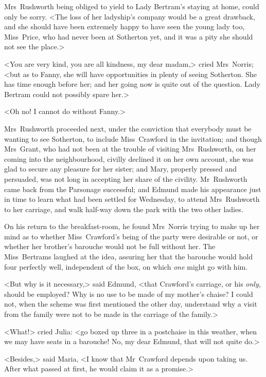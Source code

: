 Mrs~Rushworth being obliged to yield to Lady Bertram's staying at home, could only be sorry. <The loss of her ladyship's company would be a great drawback, and she should have been extremely happy to have seen the young lady too, Miss~Price, who had never been at Sotherton yet, and it was a pity she should not see the place.>

<You are very kind, you are all kindness, my dear madam,> cried Mrs~Norris; <but as to Fanny, she will have opportunities in plenty of seeing Sotherton. She has time enough before her; and her going now is quite out of the question. Lady Bertram could not possibly spare her.>

<Oh no! I cannot do without Fanny.>

Mrs~Rushworth proceeded next, under the conviction that everybody must be wanting to see Sotherton, to include Miss~Crawford in the invitation; and though Mrs~Grant, who had not been at the trouble of visiting Mrs~Rushworth, on her coming into the neighbourhood, civilly declined it on her own account, she was glad to secure any pleasure for her sister; and Mary, properly pressed and persuaded, was not long in accepting her share of the civility. Mr~Rushworth came back from the Parsonage successful; and Edmund made his appearance just in time to learn what had been settled for Wednesday, to attend Mrs~Rushworth to her carriage, and walk half-way down the park with the two other ladies.

On his return to the breakfast-room, he found Mrs~Norris trying to make up her mind as to whether Miss~Crawford's being of the party were desirable or not, or whether her brother's barouche would not be full without her. The Miss~Bertrams laughed at the idea, assuring her that the barouche would hold four perfectly well, independent of the box, on which \textit{one}  might go with him.

<But why is it necessary,> said Edmund, <that Crawford's carriage, or his \textit{only}, should be employed? Why is no use to be made of my mother's chaise? I could not, when the scheme was first mentioned the other day, understand why a visit from the family were not to be made in the carriage of the family.>

<What!> cried Julia: <go boxed up three in a postchaise in this weather, when we may have seats in a barouche! No, my dear Edmund, that will not quite do.>

<Besides,> said Maria, <I know that Mr~Crawford depends upon taking us. After what passed at first, he would claim it as a promise.>

